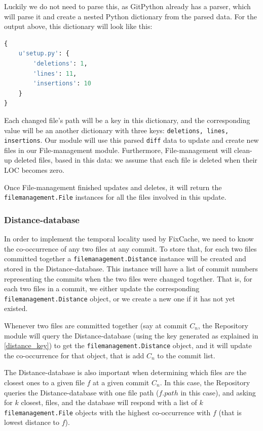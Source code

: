 \documentclass[12pt,twoside,notitlepage]{report}
\newcommand{\fxch}{FixCache}
\begin{document}
\clearpage
Luckily we do not need to parse this, as GitPython already has a parser, which will parse it and create a nested Python dictionary from the parsed data. For the output above, this dictionary will look like this:

\begin{lstlisting}[language=Python, tabsize=4, backgroundcolor=\color{lightgray}, keywordstyle=\color{black}, frame=single, framesep=10pt, xleftmargin=10pt, xrightmargin=10pt]
{ 
	u'setup.py': {
    	'deletions': 1,
	 	'lines': 11,
	 	'insertions': 10
	}
}
\end{lstlisting}

Each changed file's path will be a key in this dictionary, and the corresponding value will be an another dictionary with three keys: \texttt{deletions, lines, insertions}. Our module will use this parsed \texttt{diff} data to update and create new files in our File-management module. Furthermore, File-management will clean-up deleted files, based in this data: we assume that each file is deleted when their LOC becomes zero.

Once File-management finished updates and deletes, it will return the \texttt{filemanagement.File} instances for all the files involved in this update.
\subsubsection*{Distance-database}
In order to implement the temporal locality used by \fxch{}, we need to know the co-occurrence of any two files at any commit. To store that, for each two files committed together a \texttt{filemanagement.Distance} instance will be created and stored in the Distance-database. This instance will have a list of commit numbers representing the commits when the two files were changed together. That is, for each two files in a commit, we either update the corresponding \texttt{filemanagement.Distance} object, or we create a new one if it has not yet existed.

Whenever two files are committed together (say at commit $C_n$, the Repository module will query the Distance-database (using the key generated as explained in \ref{distance_key}) to get the \texttt{filemanagement.Distance} object, and it will update the co-occurrence for that object, that is add $C_n$ to the commit list.

The Distance-database is also important when determining which files are the closest ones to a given file $f$ at a given commit $C_n$. In this case, the Repository queries the Distance-database with one file path ($f.path$ in this case), and asking for $k$ closest, files, and the database will respond with a list of $k$ \texttt{filemanagement.File} objects with the highest co-occurrence with $f$ (that is lowest distance to $f$).
\end{document}
